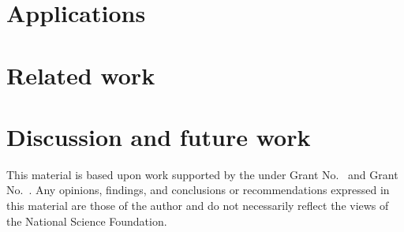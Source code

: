 \documentclass[acmlarge,anonymous]{acmart}\settopmatter{printfolios=true}
\begin{document}
\section{Applications}\label{sec-applications}

\section{Related work}\label{sec-related}




\section{Discussion and future work}\label{sec-discussion}



\begin{acks}                            %
  This material is based upon work supported by the
   under Grant
  No.~ and Grant
  No.~.  Any opinions, findings, and
  conclusions or recommendations expressed in this material are those
  of the author and do not necessarily reflect the views of the
  National Science Foundation.
\end{acks}
\end{document}
